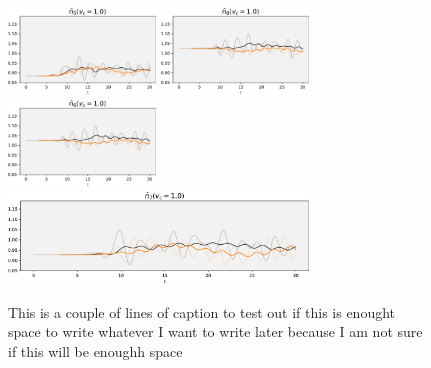 \begin{figure}[!hbt]
    \includegraphics[width=0.35\textwidth]{graph/occupation/occupation_site_5_vc_10.pdf}
    \includegraphics[width=0.35\textwidth]{graph/occupation/occupation_site_8_vc_10.pdf}
    \includegraphics[width=0.35\textwidth]{graph/occupation/occupation_site_6_vc_10.pdf}
    \includegraphics[width=0.71\textwidth]{graph/occupation/occupation_site_7_vc_10.pdf}
    \caption{This is a couple of lines of caption to test out if this is enought space to write whatever I want to write later because I am not sure if this will be enoughh space }
    \label{fig:my_label}
\end{figure}

